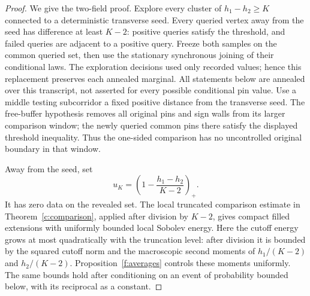 \begin{proof}
We give the two-field proof. Explore every cluster of
\(h_1-h_2\geq K\) connected to a deterministic transverse seed.
Every queried vertex away from the seed has difference at least \(K-2\):
positive queries satisfy the threshold, and failed queries are adjacent
to a positive query. Freeze both samples on the common queried set,
then use the stationary synchronous joining of their conditional laws.
The exploration decisions used only recorded values; hence this
replacement preserves each annealed marginal. All statements below are
annealed over this transcript, not asserted for every possible
conditional pin value.
Use a middle testing subcorridor a fixed positive distance from
the transverse seed. The free-buffer hypothesis removes all
original pins and sign walls from its larger comparison window;
the newly queried common pins there satisfy the displayed
threshold inequality. Thus the one-sided comparison has no
uncontrolled original boundary in that window.

Away from the seed, set
\[
 u_K=\left(1-\frac{h_1-h_2}{K-2}\right)_+ .
\]
It has zero data on the revealed set. The local truncated comparison
estimate in Theorem~\ref{c:comparison}, applied after division by
\(K-2\), gives compact filled extensions with uniformly bounded local
Sobolev energy. Here the cutoff energy grows at most quadratically with
the truncation level: after division it is bounded by the squared cutoff
norm and the macroscopic second moments of \(h_1/(K-2)\) and
\(h_2/(K-2)\). Proposition~\ref{f:averages} controls these moments uniformly.
The same bounds hold after conditioning on an event of probability
bounded below, with its reciprocal as a constant.


\end{proof}
